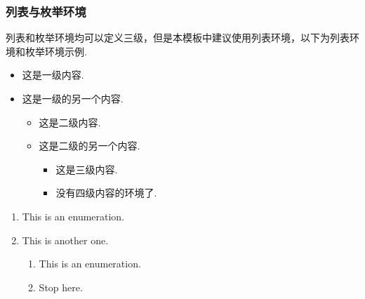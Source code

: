 \documentclass{beamer}
\begin{document}
\begin{frame}
    \frametitle{列表与枚举环境}
    列表和枚举环境均可以定义三级，但是本模板中\alert{建议使用列表环境}，以下为列表环境和枚举环境示例.
    \begin{itemize}
        \item 这是一级内容. \pause
        \item 这是一级的另一个内容. \pause
        \begin{itemize}
            \item 这是二级内容. \pause
            \item 这是二级的另一个内容. \pause
            \begin{itemize}
                 \item 这是三级内容. \pause
                 \item 没有四级内容的环境了. \pause
            \end{itemize} 
        \end{itemize}
    \end{itemize}

    \begin{enumerate}
        \item This is an enumeration. \pause
        \item This is another one. \pause
        \begin{enumerate}
             \item This is an enumeration. \pause
             \item Stop here. 
         \end{enumerate} 
    \end{enumerate}
\end{frame}
\end{document}
